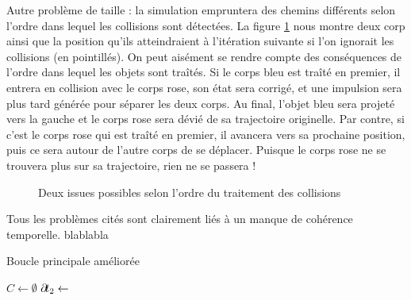 Autre problème de taille : la simulation empruntera des chemins
différents selon l'ordre dans lequel les collisions sont détectées. La
figure \ref{issues} nous montre deux corp ainsi que la position qu'ils
atteindraient à l'itération suivante si l'on ignorait les collisions
(en pointillés). On peut aisément se rendre compte des conséquences de
l'ordre dans lequel les objets sont traîtés. Si le corps bleu est
traîté en premier, il entrera en collision avec le corps rose, son
état sera corrigé, et une impulsion sera plus tard générée pour
séparer les deux corps. Au final, l'objet bleu sera projeté vers la
gauche et le corps rose sera dévié de sa trajectoire originelle. Par
contre, si c'est le corps rose qui est traîté en premier, il avancera
vers sa prochaine position, puis ce sera autour de l'autre corps de se
déplacer. Puisque le corps rose ne se trouvera plus sur sa
trajectoire, rien ne se passera !

\begin{figure}
  \centering
  \subfloat[]{  }
  \caption{Deux issues possibles selon l'ordre du traitement des collisions}
  \label{issues}
\end{figure}

Tous les problèmes cités sont clairement liés à un manque de cohérence
temporelle. blablabla

\cite{garstenauer}

\begin{algorithm}[h]
  \caption{Boucle principale améliorée}
  \label{algoMoteur2}
  \dontprintsemicolon
  \BlankLine
  $C \leftarrow \emptyset$\;
  \BlankLine
  \;
  $\partial \! t_2 \leftarrow$  
  \BlankLine
  \BlankLine
  \BlankLine
\end{algorithm}

